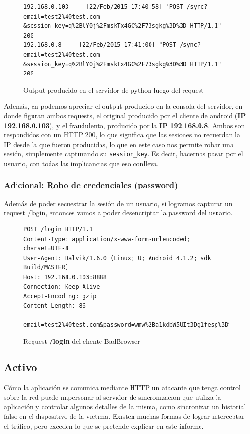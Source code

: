 \documentclass[11pt, a4paper, twoside]{article}
\begin{document}
\begin{figure}[H]
\begin{Verbatim}[frame=single,fontsize=\small]
192.168.0.103 - - [22/Feb/2015 17:40:58] "POST /sync?email=test2%40test.com
&session_key=q%2BlY0j%2FmskTx4GC%2F73sgkg%3D%3D HTTP/1.1" 200 -
192.168.0.8 - - [22/Feb/2015 17:41:00] "POST /sync?email=test2%40test.com
&session_key=q%2BlY0j%2FmskTx4GC%2F73sgkg%3D%3D HTTP/1.1" 200 -
\end{Verbatim}
\caption{Output producido en el servidor de python luego del request}
\label{fig:sync-simulado3}
\end{figure}

Además, en  podemos apreciar el output producido en la consola del servidor, en donde figuran ambos requests, el original producido por el cliente de android (\textbf{IP 192.168.0.103}), y el fraudulento, producido por la \textbf{IP 192.168.0.8}. Ambos son respondidos con un HTTP 200, lo que significa que las sesiones no recuerdan la IP desde la que fueron producidas, lo que en este caso nos permite robar una sesión, simplemente capturando su \texttt{session\_key}. Es decir, hacernos pasar por el usuario, con todas las implicancias que eso conlleva.

\subsubsection{Adicional: Robo de credenciales (password)}
Además de poder secuestrar la sesión de un usuario, si logramos capturar un request /login, entonces vamos a poder desencriptar la password del usuario.

\begin{figure}[H]
\begin{Verbatim}[frame=single,fontsize=\small]
POST /login HTTP/1.1
Content-Type: application/x-www-form-urlencoded; charset=UTF-8
User-Agent: Dalvik/1.6.0 (Linux; U; Android 4.1.2; sdk Build/MASTER)
Host: 192.168.0.103:8888
Connection: Keep-Alive
Accept-Encoding: gzip
Content-Length: 86

email=test2%40test.com&password=wmw%2Ba1kdbW5UIt3Dg1fesg%3D%3D%0A&uuid=000000000000000
\end{Verbatim}
\caption{Request \textbf{\color{red}/login} del cliente BadBrowser}
\label{fig:sniffer-login}
\end{figure}

%
%
\clearpage
\subsection{Activo}
Cómo la aplicación se comunica mediante HTTP un atacante que tenga control sobre la red puede impersonar al servidor de sincronizacion que utiliza la aplicación y controlar algunos detalles de la misma, como sincronizar un historial falso en el dispositivo de la victima. Existen muchas formas de lograr interceptar el tráfico, pero exceden lo que se pretende explicar en este informe.
\end{document}
